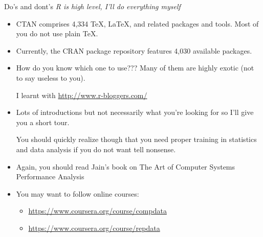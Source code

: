 \documentclass[11pt,xcolor=dvipsnames]{beamer}
\begin{document}
\begin{frame}[label=sec-4-1-3]{Do's and dont's}
\textit{R is high level, I'll do everything myself}
\begin{itemize}
\item CTAN comprises 4,334 \TeX{}, \LaTeX{}, and related packages and
tools. Most of you do not use plain \TeX{}.
\item Currently, the CRAN package repository features 4,030 available
packages.
\item How do you know which one to use??? Many of them are highly
exotic (not to say useless to you).
\begin{center}
I learnt with \url{http://www.r-bloggers.com/}
\end{center}
\end{itemize}


\begin{itemize}
\item Lots of introductions but not necessarily what you're looking
for so \alert{I'll give you a short tour}. 

You should quickly realize though that you need proper training
in statistics and data analysis if you do not want tell
nonsense.

\item Again, you should read \alert{Jain's book on The Art of Computer Systems
Performance Analysis}

\item You may want to \alert{follow online courses}:
\begin{itemize}
\item \url{https://www.coursera.org/course/compdata}
\item \url{https://www.coursera.org/course/repdata}
\end{itemize}
\end{itemize}
\end{frame}
\end{document}
